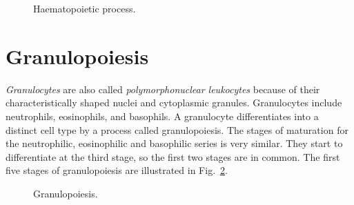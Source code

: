 \documentclass[final,a4paper,12pt,english]{UnicaPhdThesis3}
\begin{document}
	\begin{figure}[!htbp]
		\centering
		\caption{\label{fig:Haematopoiesis} Haematopoietic process.}
	\end{figure}
	
	\section{Granulopoiesis}
	\textit{Granulocytes} are also called \textit{polymorphonuclear leukocytes} because of their characteristically shaped nuclei and cytoplasmic granules. Granulocytes include neutrophils, eosinophils, and basophils. A granulocyte differentiates into a distinct cell type by a process called granulopoiesis. The stages of maturation for the neutrophilic, eosinophilic and basophilic series is very similar. They start to differentiate at the third stage, so the first two stages are in common. The first five stages of granulopoiesis are illustrated in Fig.~\ref{fig:Granulopoiesis}.
	
	\begin{figure}[!htbp]
		\centering
		\caption{\label{fig:Granulopoiesis} Granulopoiesis.}
	\end{figure}
	
\end{document}
